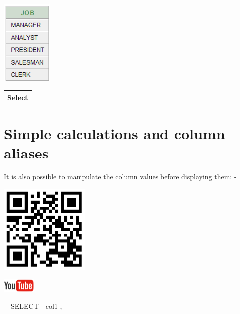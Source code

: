 \begin{center}
  
\includegraphics[width=2.491cm,height=4.124cm]{images/img (21).png}

\end{center}
\begin{flushleft}
\tablefirsthead{}
\tablehead{}
\tabletail{}
\tablelasttail{}
\begin{supertabular}{|m{11.537001cm}|}
\hline
Select 

\\\hline
\end{supertabular}
\end{flushleft}
\section{Simple calculations and column aliases}
It is also possible to manipulate the column values before displaying them: -



\begin{center}
\begin{minipage}{4.849cm}
   
\includegraphics[width=4.314cm,height=4.314cm]{images/img (22).png}
 

   
\includegraphics[width=1.582cm,height=0.674cm]{images/img (15).png}
 
\end{minipage}
\end{center}
\ \ SELECT\ \ col1 ,

